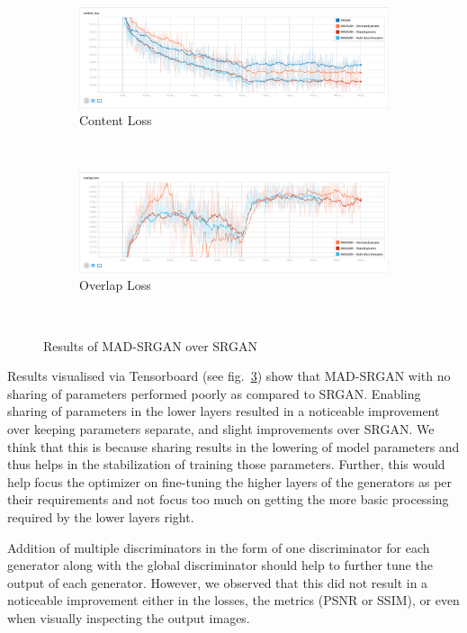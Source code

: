 \documentclass[12pt,a4paper,twocolumn]{article}
\begin{document}
\begin{figure}
\begin{subfigure}{0.48\textwidth}
                \includegraphics[width=\textwidth]{images/cont-loss.png}
                \caption{Content Loss}\label{cont-loss}
            \end{subfigure}\\[5mm]
            \begin{subfigure}{0.48\textwidth}
                \includegraphics[width=\textwidth]{images/ovrl-loss.png}
                \caption{Overlap Loss}\label{ovrl-loss}
            \end{subfigure}\\[2mm]
            \caption{Results of MAD-SRGAN over SRGAN}
            \label{fig:results}
        \end{figure}

        Results visualised via Tensorboard \cite{tensorflow} (see fig.~\ref{fig:results}) show that MAD-SRGAN with no sharing of parameters performed poorly as compared to SRGAN.
        Enabling sharing of parameters in the lower layers resulted in a noticeable improvement over keeping parameters separate, and slight improvements over SRGAN.
        We think that this is because sharing results in the lowering of model parameters and thus helps in the stabilization of training those parameters.
        Further, this would help focus the optimizer on fine-tuning the higher layers of the generators as per their requirements and not focus too much on getting the more basic processing required by the lower layers right.

        Addition of multiple discriminators in the form of one discriminator for each generator along with the global discriminator should help to further tune the output of each generator.
        However, we observed that this did not result in a noticeable improvement either in the losses, the metrics (PSNR or SSIM), or even when visually inspecting the output images.
\end{document}
